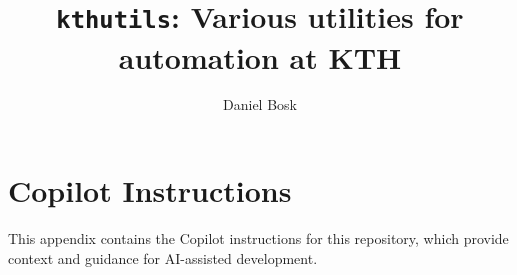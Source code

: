 \documentclass[a4paper,oneside]{memoir}
\title{%
  \texttt{kthutils}: Various utilities for automation at KTH
}
\author{%
  Daniel Bosk
}
\affil{%
  KTH EECS\\
  \texttt{dbosk@kth.se}
}
\begin{document}
\maketitle
\begin{abstract}
  
\end{abstract}

\clearpage
\vspace*{\fill}
\clearpage

\clearpage

\tableofcontents*
\clearpage







\appendix
\chapter{Copilot Instructions}

This appendix contains the Copilot instructions for this repository,
which provide context and guidance for AI-assisted development.

\inputminted{markdown}{../.github/copilot-instructions.md}

\printbibliography
\end{document}
